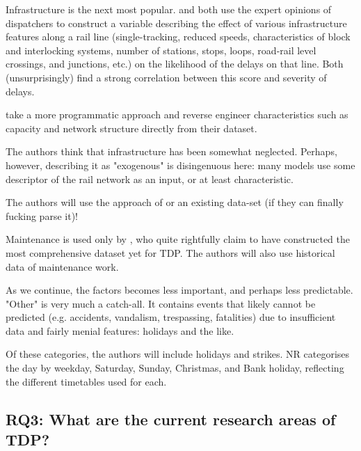 \documentclass{article}
\begin{document}
Infrastructure is the next most popular. \cite{milinkovic_et_al_2013} and \cite{markovic_et_al_2015} both use the expert opinions of dispatchers to construct a variable describing the effect of various infrastructure features along a rail line (single-tracking, reduced speeds, characteristics of block and interlocking systems, number of stations, stops, loops, road-rail level crossings, and junctions, etc.) on the likelihood of the delays on that line. Both (unsurprisingly) find a strong correlation between this score and severity of delays.

\cite{nair_et_al_2019} take a more programmatic approach and reverse engineer characteristics such as capacity and network structure directly from their dataset.

The authors think that infrastructure has been somewhat neglected. Perhaps, however, describing it as "exogenous" is disingenuous here: many models use some descriptor of the rail network as an input, or at least characteristic.

The authors will use the approach of \cite{nair_et_al_2019} or an existing data-set (if they can finally fucking parse it)!

Maintenance is used only by \cite{nair_et_al_2019}, who quite rightfully claim to have constructed the most comprehensive dataset yet for TDP. The authors will also use historical data of maintenance work.

As we continue, the factors becomes less important, and perhaps less predictable. "Other" is very much a catch-all. It contains events that likely cannot be predicted (e.g. accidents, vandalism, trespassing, fatalities) due to insufficient data and fairly menial features: holidays and the like.

Of these categories, the authors will include holidays and strikes. NR categorises the day by weekday, Saturday, Sunday, Christmas, and Bank holiday, reflecting the different timetables used for each.





\subsection{RQ3: What are the current research areas of TDP?}
\end{document}
